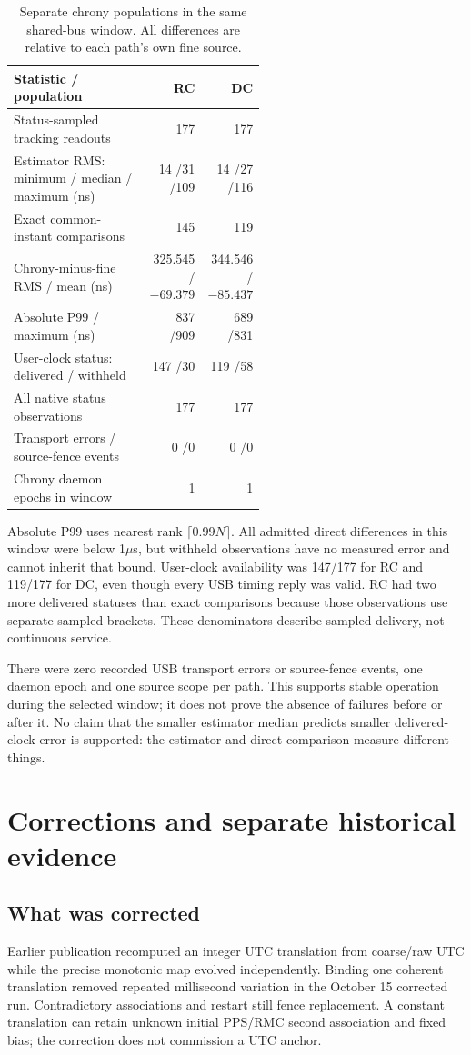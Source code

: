 \documentclass[11pt,letterpaper]{article}
\begin{document}
\begin{table}[htbp]\centering\small
\caption{Separate chrony populations in the same shared-bus window. All differences are relative to each path's own fine source.}\label{tab:chrony}
\begin{tabular}{L{0.55\linewidth}rr}\toprule Statistic / population & RC & DC\\\midrule
Status-sampled tracking readouts &177 &177\\
Estimator RMS: minimum / median / maximum (ns) &14 /31 /109 &14 /27 /116\\
Exact common-instant comparisons &145 &119\\
Chrony-minus-fine RMS / mean (ns) &325.545 /$-69.379$ &344.546 /$-85.437$\\
Absolute P99 / maximum (ns) &837 /909 &689 /831\\
User-clock status: delivered / withheld &147 /30 &119 /58\\
All native status observations &177 &177\\
Transport errors / source-fence events &0 /0 &0 /0\\
Chrony daemon epochs in window &1 &1\\\bottomrule
\end{tabular}\end{table}

Absolute P99 uses nearest rank $\lceil0.99N\rceil$. All admitted direct differences in this window were below 1$\mu$s, but withheld observations have no measured error and cannot inherit that bound. User-clock availability was 147/177 for RC and 119/177 for DC, even though every USB timing reply was valid. RC had two more delivered statuses than exact comparisons because those observations use separate sampled brackets. These denominators describe sampled delivery, not continuous service.

There were zero recorded USB transport errors or source-fence events, one daemon epoch and one source scope per path. This supports stable operation during the selected window; it does not prove the absence of failures before or after it. No claim that the smaller estimator median predicts smaller delivered-clock error is supported: the estimator and direct comparison measure different things.

\section{Corrections and separate historical evidence}
\subsection{What was corrected}
Earlier publication recomputed an integer UTC translation from coarse/raw UTC while the precise monotonic map evolved independently. Binding one coherent translation removed repeated millisecond variation in the October 15 corrected run. Contradictory associations and restart still fence replacement. A constant translation can retain unknown initial PPS/RMC second association and fixed bias; the correction does not commission a UTC anchor.
\end{document}

